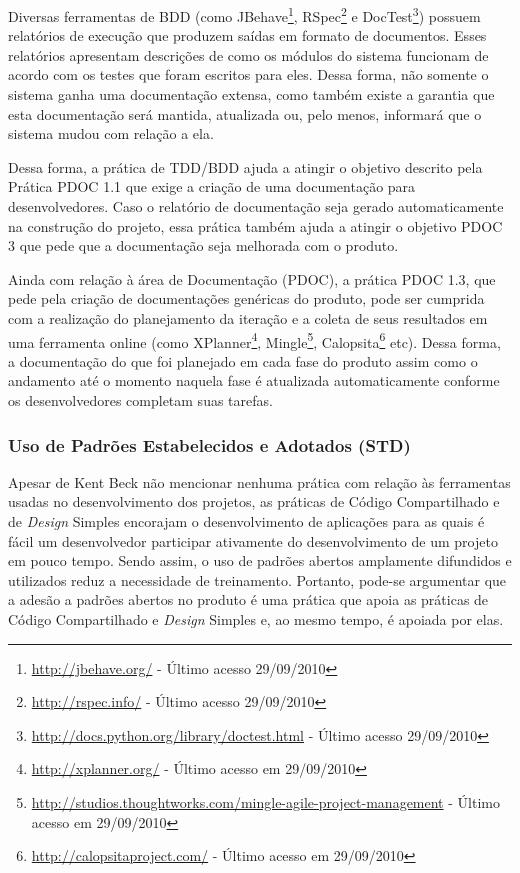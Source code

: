 Diversas ferramentas de BDD (como
JBehave\footnote{\url{http://jbehave.org/} - Último acesso
  29/09/2010}, RSpec\footnote{\url{http://rspec.info/} - Último acesso
  29/09/2010} e
DocTest\footnote{\url{http://docs.python.org/library/doctest.html} -
  Último acesso 29/09/2010}) possuem relatórios de execução que
produzem saídas em formato de documentos. Esses relatórios apresentam
descrições de como os módulos do sistema funcionam de acordo com os
testes que foram escritos para eles. Dessa forma, não somente o
sistema ganha uma documentação extensa, como também existe a garantia
que esta documentação será mantida, atualizada ou, pelo menos,
informará que o sistema mudou com relação a ela.

Dessa forma, a prática de TDD/BDD ajuda a atingir o objetivo descrito
pela Prática PDOC 1.1 que exige a criação de uma documentação para
desenvolvedores. Caso o relatório de documentação seja gerado
automaticamente na construção do projeto, essa prática também ajuda a
atingir o objetivo PDOC 3 que pede que a documentação seja melhorada
com o produto.

Ainda com relação à área de Documentação (PDOC), a prática PDOC 1.3,
que pede pela criação de documentações genéricas do produto, pode ser
cumprida com a realização do planejamento da iteração e a coleta de
seus resultados em uma ferramenta online (como
XPlanner\footnote{\url{http://xplanner.org/} - Último acesso em
  29/09/2010},
Mingle\footnote{\url{http://studios.thoughtworks.com/mingle-agile-project-management}
  - Último acesso em 29/09/2010},
Calopsita\footnote{\url{http://calopsitaproject.com/} - Último acesso
  em 29/09/2010} etc). Dessa forma, a documentação do que foi
planejado em cada fase do produto assim como o andamento até o momento
naquela fase é atualizada automaticamente conforme os desenvolvedores
completam suas tarefas.

\subsubsection{Uso de Padrões Estabelecidos e Adotados (STD)}
\label{sec:+std}

Apesar de Kent Beck não mencionar nenhuma prática com relação às
ferramentas usadas no desenvolvimento dos projetos, as práticas de
Código Compartilhado e de \textit{Design} Simples encorajam o
desenvolvimento de aplicações para as quais é fácil um desenvolvedor
participar ativamente do desenvolvimento de um projeto em pouco
tempo. Sendo assim, o uso de padrões abertos amplamente difundidos e
utilizados reduz a necessidade de treinamento.  Portanto, pode-se
argumentar que a adesão a padrões abertos no produto é uma prática que
apoia as práticas de Código Compartilhado e \textit{Design} Simples e,
ao mesmo tempo, é apoiada por elas.

